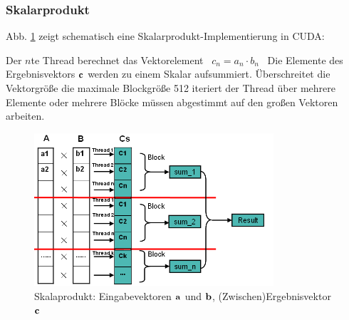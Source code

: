 


\subsubsection{Skalarprodukt}

Abb. \ref{Vektor} zeigt schematisch eine Skalarprodukt-Implementierung in CUDA:

Der $n$te Thread berechnet das Vektorelement \mbox{ $c_n = a_n \cdot b_n$ }
Die Elemente des Ergebnisvektors $ \bf c $ werden  zu einem Skalar
aufsummiert.
Überschreitet die Vektorgröße die maximale Blockgröße 512 iteriert der Thread
über mehrere Elemente oder mehrere Blöcke müssen
abgestimmt auf den großen Vektoren arbeiten.


\begin{figure}[htbp]
\includegraphics[width=3.5in]{../xby/pic/Vektor}
\caption{Skalaprodukt: Eingabevektoren $ \bf a$ und $ \bf b$, (Zwischen)Ergebnisvektor $ \bf c$}
\label{Vektor}
\end{figure}